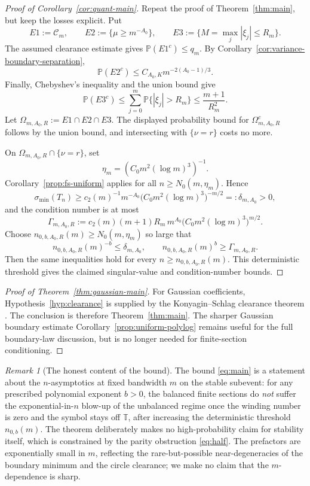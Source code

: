\documentclass[11pt]{amsart}
\numberwithin{equation}{section}
\theoremstyle{definition}
\theoremstyle{remark}
\newtheorem{remark}[theorem]{Remark}
\newcommand{\T}{\mathbb T}
\newcommand{\Prob}{\mathbb P}
\newcommand{\smin}{\sigma_{\min}}
\begin{document}
\begin{proof}[Proof of Corollary~\ref{cor:quant-main}]
Repeat the proof of Theorem~\ref{thm:main}, but keep the losses explicit.  Put
\[
  E1:=\mathcal C_m,\qquad
  E2:=\{\mu\ge m^{-A_0}\},\qquad
  E3:=\{M=\max_j|\xi_j|\le R_m\}.
\]
The assumed clearance estimate gives \(\Prob(E1^c)\le q_m\).  By
Corollary~\ref{cor:variance-boundary-separation},
\[
  \Prob(E2^c)\le C_{A_0,K}m^{-2(A_0-1)/3}.
\]
Finally, Chebyshev's inequality and the union bound give
\[
  \Prob(E3^c)
  \le\sum_{j=0}^m\Prob\{|\xi_j|>R_m\}
  \le\frac{m+1}{R_m^2}.
\]
Let \(\Omega_{m,A_0,R}:=E1\cap E2\cap E3\).  The displayed probability bound for
\(\Omega_{m,A_0,R}^c\) follows by the union bound, and intersecting with
\(\{\nu=r\}\) costs no more.

On \(\Omega_{m,A_0,R}\cap\{\nu=r\}\), set
\[
  \eta_m=(C_0m^2(\log m)^3)^{-1}.
\]
Corollary~\ref{prop:fs-uniform} applies for all \(n\ge N_0(m,\eta_m)\).  Hence
\[
  \smin(T_n)\ge
  c_2(m)^{-1}m^{-A_0}\bigl(C_0m^2(\log m)^3\bigr)^{-m/2}
  =:\delta_{m,A_0}>0,
\]
and the condition number is at most
\[
  \Gamma_{m,A_0,R}:=
  c_2(m)(m+1)R_m\,m^{A_0}\bigl(C_0m^2(\log m)^3\bigr)^{m/2}.
\]
Choose \(n_{0,b,A_0,R}(m)\ge N_0(m,\eta_m)\) so large that
\[
  n_{0,b,A_0,R}(m)^{-b}\le\delta_{m,A_0},\qquad
  n_{0,b,A_0,R}(m)^b\ge\Gamma_{m,A_0,R}.
\]
Then the same inequalities hold for every \(n\ge n_{0,b,A_0,R}(m)\).  This
deterministic threshold gives the claimed singular-value and condition-number
bounds.
\end{proof}

\begin{proof}[Proof of Theorem~\ref{thm:gaussian-main}]
For Gaussian coefficients, Hypothesis~\ref{hyp:clearance} is supplied by the
Konyagin--Schlag clearance theorem \cite{KMS}.  The conclusion is therefore
Theorem~\ref{thm:main}.  The sharper Gaussian boundary estimate
Corollary~\ref{prop:uniform-polylog} remains useful for the full boundary-law
discussion, but is no longer needed for finite-section conditioning.
\end{proof}

\begin{remark}[The honest content of the bound]\label{rem:honest-bound}
The bound \eqref{eq:main} is a statement about the $n$-asymptotics at fixed bandwidth $m$ on the stable subevent: for any prescribed polynomial exponent \(b>0\), the balanced finite sections do \emph{not} suffer the exponential-in-$n$ blow-up of the unbalanced regime once the winding number is zero and the symbol stays off $\T$, after increasing the deterministic threshold \(n_{0,b}(m)\). The theorem deliberately makes no high-probability claim for stability itself, which is constrained by the parity obstruction \eqref{eq:half}. The prefactors are exponentially small in $m$, reflecting the rare-but-possible near-degeneracies of the boundary minimum and the circle clearance; we make no claim that the $m$-dependence is sharp.
\end{remark}
\end{document}
